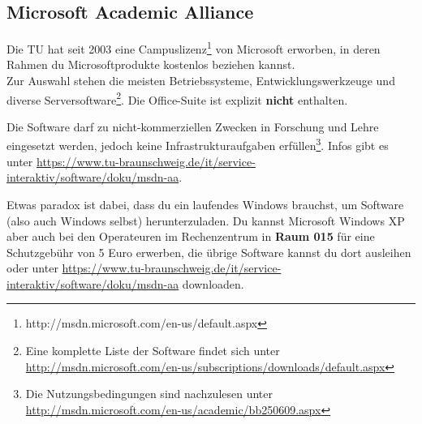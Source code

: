 \begin{multicols}{2}
\subsection{Microsoft Academic Alliance}
	\label{msdnaa}
	Die TU hat seit 2003 eine Campuslizenz\footnote{http://msdn.microsoft.com/en-us/default.aspx} von Microsoft erworben, in deren Rahmen du Microsoftprodukte kostenlos beziehen kannst.\\ 
	Zur Auswahl stehen die meisten Betriebssysteme, Entwicklungswerkzeuge und diverse Serversoftware\footnote{\sloppy Eine komplette Liste der Software findet sich unter \url{http://msdn.microsoft.com/en-us/subscriptions/downloads/default.aspx}}. Die Office-Suite ist explizit \textbf{nicht} enthalten.

	Die Software darf zu nicht-kommerziellen Zwecken in Forschung und Lehre eingesetzt werden, jedoch keine Infrastrukturaufgaben erfüllen\footnote{Die Nutzungsbedingungen sind nachzulesen unter \url{http://msdn.microsoft.com/en-us/academic/bb250609.aspx}}. Infos gibt es unter \url{https://www.tu-braunschweig.de/it/service-interaktiv/software/doku/msdn-aa}.

	Etwas paradox ist dabei, dass du ein laufendes Windows brauchst, um Software (also auch Windows selbst) herunterzuladen. Du kannst Microsoft Windows XP aber auch bei den Operateuren im Rechenzentrum in \textbf{Raum 015} für eine Schutzgebühr von 5 Euro erwerben, die übrige Software kannst du dort ausleihen oder unter \url{https://www.tu-braunschweig.de/it/service-interaktiv/software/doku/msdn-aa} downloaden.
\end{multicols}